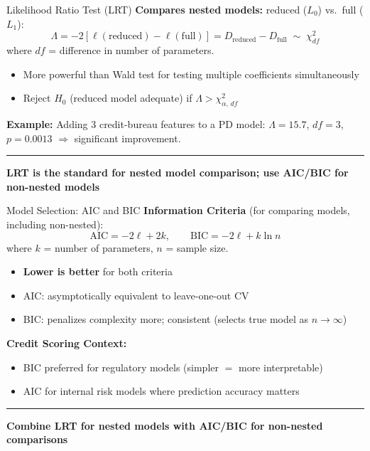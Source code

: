 \documentclass[8pt,aspectratio=169]{beamer}
\newcommand{\bottomnote}[1]{%
\vfill
\vspace{-2mm}
\textcolor{mllavender2}{\rule{\textwidth}{0.4pt}}
\vspace{1mm}
\footnotesize
\textbf{#1}
}
\begin{document}
\begin{frame}[t]{Likelihood Ratio Test (LRT)}
\textbf{Compares nested models:} reduced ($L_0$) vs.\ full ($L_1$):
\begin{equation}
  \Lambda = -2\left[\ell(\text{reduced}) - \ell(\text{full})\right] = D_{\text{reduced}} - D_{\text{full}} \;\sim\; \chi^2_{df}
\end{equation}
where $df$ = difference in number of parameters.

\begin{itemize}
\item More powerful than Wald test for testing multiple coefficients simultaneously
\item Reject $H_0$ (reduced model adequate) if $\Lambda > \chi^2_{\alpha,\, df}$
\end{itemize}

\vspace{0.3em}
\textbf{Example:} Adding 3 credit-bureau features to a PD model:
$\Lambda = 15.7$, $df = 3$, $p = 0.0013$ $\Rightarrow$ significant improvement.
\bottomnote{LRT is the standard for nested model comparison; use AIC/BIC for non-nested models}
\end{frame}

\begin{frame}[t]{Model Selection: AIC and BIC}
\textbf{Information Criteria} (for comparing models, including non-nested):
\begin{equation}
  \text{AIC} = -2\ell + 2k, \qquad \text{BIC} = -2\ell + k\ln n
\end{equation}
where $k$ = number of parameters, $n$ = sample size.

\begin{itemize}
\item \textbf{Lower is better} for both criteria
\item AIC: asymptotically equivalent to leave-one-out CV
\item BIC: penalizes complexity more; consistent (selects true model as $n \to \infty$)
\end{itemize}

\vspace{0.3em}
\textbf{Credit Scoring Context:}
\begin{itemize}
\item BIC preferred for regulatory models (simpler $=$ more interpretable)
\item AIC for internal risk models where prediction accuracy matters
\end{itemize}
\bottomnote{Combine LRT for nested models with AIC/BIC for non-nested comparisons}
\end{frame}
\end{document}
